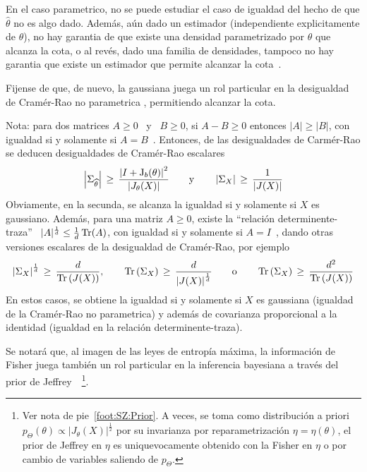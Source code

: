 %
\noindent En el  caso parametrico, no se puede estudiar el  caso de igualdad del
hecho  de  que  $\widehat{\theta}$ no  es  algo  dado.   Adem\'as, a\'un  dado  un
estimador  (independiente explicitamente de  $\theta$), no  hay garantia  de que
existe  una  densidad parametrizado  por  $\theta$ que  alcanza  la  cota, o  al
rev\'es, dado una  familia de densidades, tampoco no hay  garantia que existe un
estimador que permite alcanzar la cota~\cite{CovTho06,  Kay93}.

Fijense de que, de nuevo, la gaussiana juega un rol particular en la desigualdad
de Cram\'er-Rao no parametrica , permitiendo alcanzar la cota.

Nota: para dos  matrices $A \ge 0$  \ y \ $B \ge  0$, si $A - B  \ge 0$ entonces
$|A|  \ge  |B|$,   con  igualdad  si  y  solamente   si  $A  =  B$~\cite[cap.~1,
teorema~25]{MagNeu99}.   Entonces,  de  las  desigualdades  de  Carm\'er-Rao  se
deducen     desigualdades     de     Cram\'er-Rao    escalares
%
\[
\left|   \Sigma_{\widehat{\theta}}  \right|   \,   \ge  \,   \frac{\left|  I   +
    \operatorname{J}_b(\theta) \right|^2}{\left| J_\theta(X) \right|} \qquad \mbox{y} \qquad
\left| \Sigma_X \right| \, \ge \, \frac{1}{\left| J(X) \right|}
\]
%
Obviamente,  en la secunda,  se alcanza  la igualdad  si y  solamente si  $X$ es
gaussiano.  Adem\'as,  para   una  matriz  $A  \ge  0$,   existe  la  ``relaci\'on
determinente-traza''  \ $|A|^{\frac1d} \le  \frac1d \operatorname{Tr}(A)$,  con igualdad  si y
solamente  si $A  = I$~\cite[cap.~11,  sec.~4]{MagNeu99}, dando  otras versiones
escalares de la desigualdad de Cram\'er-Rao, por ejemplo
%
\[
\left| \Sigma_X  \right|^{\frac1d} \,  \ge \, \frac{d}{\operatorname{Tr}\left(  J(X) \right)},
\qquad   \operatorname{Tr}\left(   \Sigma_X   \right)   \,   \ge   \,   \frac{d}{\left|   J(X)
  \right|^{\frac1d}} \qquad \mbox{o} \qquad \operatorname{Tr}\left( \Sigma_X \right) \, \ge \,
\frac{d^2}{\operatorname{Tr}\left( J(X) \right)}
\]
%
En  estos casos,  se obtiene  la igualdad  si y  solamente si  $X$  es gaussiana
(igualdad de la Cram\'er-Rao no parametrica) y adem\'as de covarianza proporcional
a la identidad (igualdad en la relaci\'on determinente-traza).

Se notar\'a que,  al imagen de las leyes de  entrop\'ia m\'axima, la informaci\'on
de  Fisher  juega tambi\'en  un  rol particular  en  la  inferencia bayesiana  a
trav\'es del prior de Jeffrey~\cite{Jef46, Jef48, LehCas98, Rob07}~\footnote{Ver
  nota  de pie~\ref{foot:SZ:Prior}.   A  veces, se  toma  como distribuci\'on  a
  priori $p_\Theta(\theta) \propto  |J_\theta(X)|^\frac12$ por su invarianza por
  reparametrizaci\'on $\eta =  \eta(\theta)$, \ie el prior de  Jeffrey en $\eta$
  es uniquevocamente obtenido con la Fisher  en $\eta$ o por cambio de variables
  saliendo de $p_\Theta$.}.

